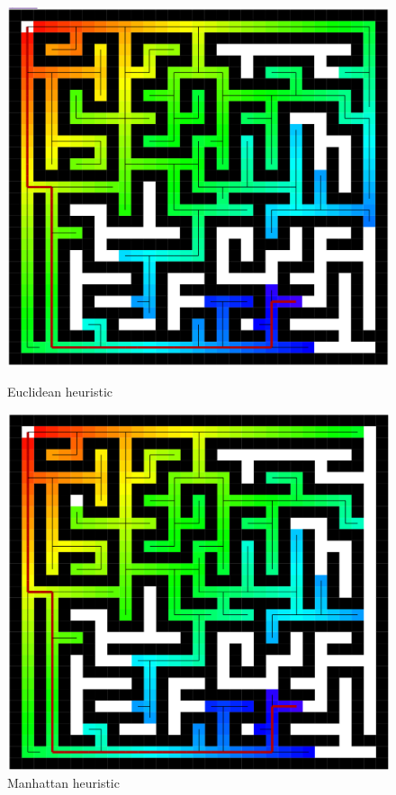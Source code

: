 \documentclass[titlepage]{article}
\begin{document}
\begin{figure}[!htb]
  \includegraphics[width=\linewidth]{Euclidean.png}
  \caption{Euclidean heuristic}\label{fig:euc}
\endminipage\hfill
{}
  \includegraphics[width=\linewidth]{Manhattan.png}
  \caption{Manhattan heuristic}\label{fig:manhat}
\endminipage\hfill
\end{figure}
\end{document}
